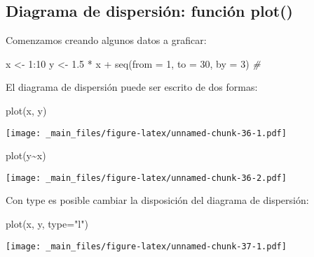 \documentclass[
]{book}
\newenvironment{Shaded}{\begin{snugshade}}{\end{snugshade}}
\newcommand{\AttributeTok}[1]{\textcolor[rgb]{0.77,0.63,0.00}{#1}}
\newcommand{\CommentTok}[1]{\textcolor[rgb]{0.56,0.35,0.01}{\textit{#1}}}
\newcommand{\DecValTok}[1]{\textcolor[rgb]{0.00,0.00,0.81}{#1}}
\newcommand{\FloatTok}[1]{\textcolor[rgb]{0.00,0.00,0.81}{#1}}
\newcommand{\FunctionTok}[1]{\textcolor[rgb]{0.00,0.00,0.00}{#1}}
\newcommand{\NormalTok}[1]{#1}
\newcommand{\OtherTok}[1]{\textcolor[rgb]{0.56,0.35,0.01}{#1}}
\newcommand{\SpecialCharTok}[1]{\textcolor[rgb]{0.00,0.00,0.00}{#1}}
\newcommand{\StringTok}[1]{\textcolor[rgb]{0.31,0.60,0.02}{#1}}
\begin{document}
\hypertarget{diagrama-de-dispersiuxf3n-funciuxf3n-plot}{%
\subsection{Diagrama de dispersión: función plot()}\label{diagrama-de-dispersiuxf3n-funciuxf3n-plot}}

Comenzamos creando algunos datos a graficar:

\begin{Shaded}
\begin{Highlighting}[]
\NormalTok{x }\OtherTok{\textless{}{-}} \DecValTok{1}\SpecialCharTok{:}\DecValTok{10}
\NormalTok{y }\OtherTok{\textless{}{-}} \FloatTok{1.5} \SpecialCharTok{*}\NormalTok{ x }\SpecialCharTok{+} \FunctionTok{seq}\NormalTok{(}\AttributeTok{from =} \DecValTok{1}\NormalTok{, }\AttributeTok{to =} \DecValTok{30}\NormalTok{,  }\AttributeTok{by =} \DecValTok{3}\NormalTok{) }\CommentTok{\# }
\end{Highlighting}
\end{Shaded}

El diagrama de dispersión puede ser escrito de dos formas:

\begin{Shaded}
\begin{Highlighting}[]
\FunctionTok{plot}\NormalTok{(x, y)}
\end{Highlighting}
\end{Shaded}

\texttt{[image: \_main\_files/figure-latex/unnamed-chunk-36-1.pdf]}

\begin{Shaded}
\begin{Highlighting}[]
\FunctionTok{plot}\NormalTok{(y}\SpecialCharTok{\textasciitilde{}}\NormalTok{x)}
\end{Highlighting}
\end{Shaded}

\texttt{[image: \_main\_files/figure-latex/unnamed-chunk-36-2.pdf]}

Con type es posible cambiar la disposición del diagrama de dispersión:

\begin{Shaded}
\begin{Highlighting}[]
\FunctionTok{plot}\NormalTok{(x, y, }\AttributeTok{type=}\StringTok{"l"}\NormalTok{)}
\end{Highlighting}
\end{Shaded}

\texttt{[image: \_main\_files/figure-latex/unnamed-chunk-37-1.pdf]}
\end{document}
